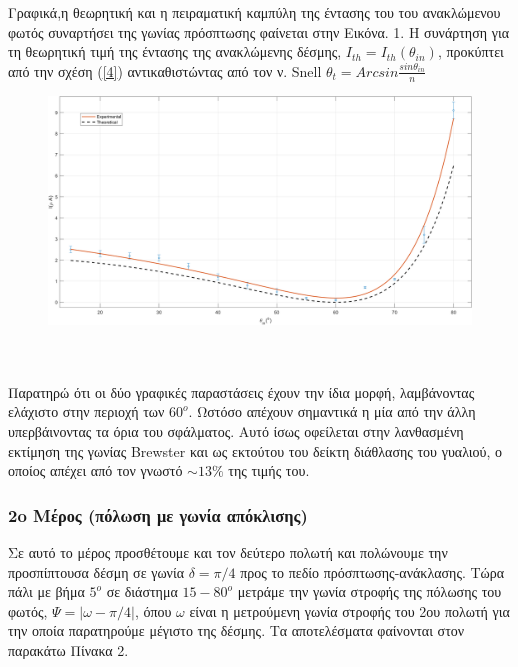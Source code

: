 \documentclass[a4paper]{article}
\begin{document}
Γραφικά,η θεωρητική και η πειραματική καμπύλη της έντασης του του ανακλώμενου φωτός συναρτήσει της γωνίας πρόσπτωσης φαίνεται στην Εικόνα. 1. Η συνάρτηση για τη θεωρητική τιμή της έντασης της ανακλώμενης δέσμης, $I_{th} = I_{th}(\theta_{in})$, προκύπτει από την σχέση (\ref{4}) αντικαθιστώντας από τον ν. Snell $\theta_t = Arcsin\frac{sin\theta_{in}}{n}$
\begin{figure}[h!]
\centering 
\caption{ }
\includegraphics[scale=0.5]{I(th).png}
\end{figure}
 \\ \\
Παρατηρώ ότι οι δύο γραφικές παραστάσεις έχουν την ίδια μορφή, λαμβάνοντας ελάχιστο στην περιοχή των $60^o$. Ωστόσο απέχουν σημαντικά η μία από την άλλη υπερβάινοντας τα όρια του σφάλματος. Αυτό ίσως οφείλεται στην λανθασμένη εκτίμηση της γωνίας Brewster και ως εκτούτου του δείκτη διάθλασης του γυαλιού, ο οποίος απέχει από τον γνωστό  $ \sim 13\%$ της τιμής του.\footnotemark 
{}

\subsubsection*{2o Μέρος (πόλωση με γωνία απόκλισης)}
Σε αυτό το μέρος προσθέτουμε και τον δεύτερο πολωτή και πολώνουμε την προσπίπτουσα δέσμη σε γωνία $\delta = \pi/4 $ προς το πεδίο πρόσπτωσης-ανάκλασης. Τώρα πάλι με βήμα $5^o$ σε διάστημα $15-80^o$ μετράμε την γωνία στροφής της πόλωσης του φωτός, $\Psi=|\omega-\pi/4|$, όπου $\omega$ είναι η μετρούμενη γωνία στροφής του 2ου πολωτή για την οποία παρατηρούμε μέγιστο της δέσμης.
Τα αποτελέσματα φαίνονται στον παρακάτω Πίνακα 2. 
\end{document}
